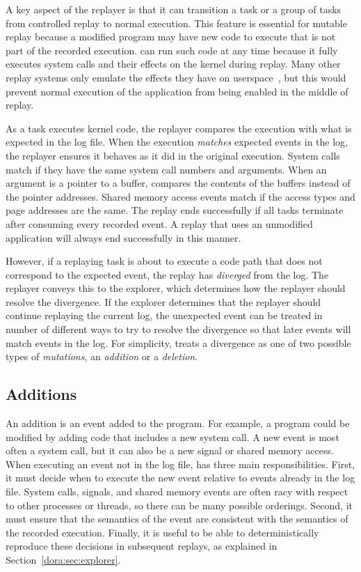 A key aspect of the replayer is that it can
transition a task or a group of tasks from controlled replay to normal
execution. This feature is essential for mutable replay because a
modified program may have new code to execute that is not
part of the recorded execution.
{\dora} can run such code at any time because it
fully executes system calls and their effects on the kernel during
replay. Many other replay systems only emulate the effects they have
on userspace~\cite{jockey,r2:osdi}, but this would prevent normal
execution of the application from being enabled in the middle of
replay.

As a task executes kernel code, the replayer compares the execution
with what is expected in the log file.  When the execution
\emph{matches} expected events in the log, the 
replayer ensures it behaves as it did in the original execution.  
System calls match if they have the same system call numbers and
arguments. When an argument is a pointer to a buffer, {\dora}
compares the contents of the buffers instead of the pointer addresses.
Shared memory access events match if the access types and page
addresses are the same.  The replay ends successfully if all tasks
terminate after consuming every recorded event. A replay that uses an
unmodified application will always end successfully in this manner.

However, if a replaying task is about to execute a code path that does
not correspond to the expected event, the replay has \emph{diverged}
from the log.  The replayer conveys this to the explorer, which
determines how the replayer should resolve the divergence.
If the explorer determines that the replayer should continue
replaying the current log, the unexpected event can be treated in
number of different ways to try to resolve the divergence so that
later events will match events in the log.  For simplicity, {\dora}
treats a divergence as one of two possible types of \emph{mutations},
an \emph{addition} or a \emph{deletion}.  

\subsection{Additions}
An addition is an event added to the program.  For example, a program
could be modified by adding code that includes a new system call.  A
new event is most often a system call, but it can also be a new signal
or shared memory access.  When executing an event not in the log file,
{\dora} has three main responsibilities.  First, it must decide when
to execute the new event relative to events already in the log
file. System calls, signals, and shared memory events are often racy
with respect to other processes or threads, so there can be many
possible orderings.  Second, it must ensure that the semantics of the
event are consistent with the semantics of the recorded execution.
Finally, it is useful to be able to deterministically reproduce these
decisions in subsequent replays, as explained in
Section~\ref{dora:sec:explorer}. 

